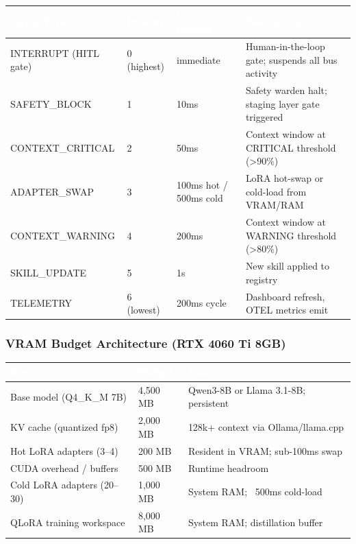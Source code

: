 \documentclass[11pt,letterpaper]{article}
\newcommand{\tableheader}[1]{\textbf{\sffamily\textcolor{white}{#1}}}
\begin{document}
\begin{center}
\begin{tabularx}{\textwidth}{L{3cm}C{2cm}C{2cm}X}
\toprule
{}
\tableheader{Signal Type} & \tableheader{Priority} & \tableheader{Latency Budget} & \tableheader{Description} \\
\midrule
INTERRUPT (HITL gate) & 0 (highest) & immediate & Human-in-the-loop gate; suspends all bus activity \\
SAFETY\_BLOCK & 1 & 10ms & Safety warden halt; staging layer gate triggered \\
CONTEXT\_CRITICAL & 2 & 50ms & Context window at CRITICAL threshold (>90\%) \\
ADAPTER\_SWAP & 3 & 100ms hot / 500ms cold & LoRA hot-swap or cold-load from VRAM/RAM \\
CONTEXT\_WARNING & 4 & 200ms & Context window at WARNING threshold (>80\%) \\
SKILL\_UPDATE & 5 & 1s & New skill applied to registry \\
TELEMETRY & 6 (lowest) & 200ms cycle & Dashboard refresh, OTEL metrics emit \\
\bottomrule
\end{tabularx}
\end{center}

\subsubsection{VRAM Budget Architecture (RTX 4060 Ti 8GB)}

\begin{center}
\begin{tabularx}{\textwidth}{L{4cm}C{2.5cm}X}
\toprule
{}
\tableheader{Resource} & \tableheader{Budget} & \tableheader{Notes} \\
\midrule
Base model (Q4\_K\_M 7B) & 4,500 MB & Qwen3-8B or Llama 3.1-8B; persistent \\
KV cache (quantized fp8) & 2,000 MB & 128k+ context via Ollama/llama.cpp \\
Hot LoRA adapters (3--4) & 200 MB & Resident in VRAM; sub-100ms swap \\
CUDA overhead / buffers & 500 MB & Runtime headroom \\
Cold LoRA adapters (20--30) & 1,000 MB & System RAM; ~500ms cold-load \\
QLoRA training workspace & 8,000 MB & System RAM; distillation buffer \\
\bottomrule
\end{tabularx}
\end{center}
\end{document}
